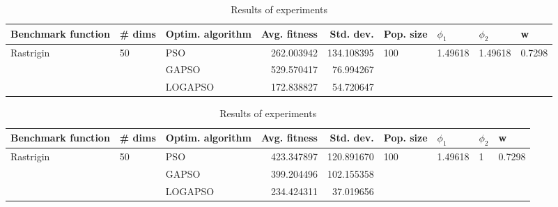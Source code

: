 \documentclass{article}
\begin{document}
\begin{table}
\centering
\caption{Results of experiments}
\begin{tabular}{lllrrllll}
\toprule
        Benchmark function &             \# dims & Optim. algorithm &  Avg. fitness &  Std. dev. &            Pop. size &               $\phi_{1}$ &               $\phi_{2}$ &                       w \\
\midrule
\multirow{3}{*}{Rastrigin} & \multirow{3}{*}{50} &              PSO &    262.003942 & 134.108395 & \multirow{3}{*}{100} & \multirow{3}{*}{1.49618} & \multirow{3}{*}{1.49618} & \multirow{3}{*}{0.7298} \\
                           &                     &            GAPSO &    529.570417 &  76.994267 &                      &                          &                          &                         \\
                           &                     &          LOGAPSO &    172.838827 &  54.720647 &                      &                          &                          &                         \\
\bottomrule
\end{tabular}
\end{table}
\begin{table}
\centering
\caption{Results of experiments}
\begin{tabular}{lllrrllll}
\toprule
        Benchmark function &             \# dims & Optim. algorithm &  Avg. fitness &  Std. dev. &            Pop. size &               $\phi_{1}$ &         $\phi_{2}$ &                       w \\
\midrule
\multirow{3}{*}{Rastrigin} & \multirow{3}{*}{50} &              PSO &    423.347897 & 120.891670 & \multirow{3}{*}{100} & \multirow{3}{*}{1.49618} & \multirow{3}{*}{1} & \multirow{3}{*}{0.7298} \\
                           &                     &            GAPSO &    399.204496 & 102.155358 &                      &                          &                    &                         \\
                           &                     &          LOGAPSO &    234.424311 &  37.019656 &                      &                          &                    &                         \\
\bottomrule
\end{tabular}
\end{table}
\end{document}
